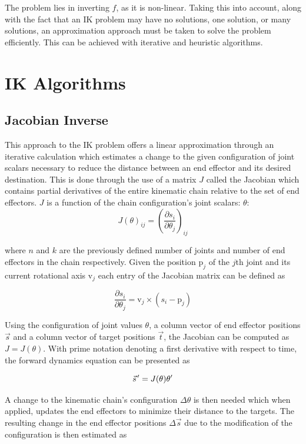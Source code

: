 The problem lies in inverting \(f\), as it is non-linear. Taking this into
account, along with the fact that an IK problem may have no solutions, one
solution, or many solutions, an approximation approach must be taken to solve
the problem efficiently. This can be achieved with iterative and heuristic
algorithms.

\section{IK Algorithms}
\subsection{Jacobian Inverse}
This approach to the IK problem offers a linear approximation through an
iterative calculation which estimates a change to the given configuration of
joint scalars necessary to reduce the distance between an end effector and its
desired destination. This is done through the use of a matrix \(J\) called the
Jacobian which contains partial derivatives of the entire kinematic chain
relative to the set of end effectors. \(J\) is a function of the chain
configuration's joint scalars:
\(\theta\):
\begin{equation}
    J(\theta)_{ij} = \left(\frac{\partial s_i}{\partial \theta_j}\right)_{ij}
\end{equation}

where \(n\) and \(k\) are the previously defined number of joints and number of
end effectors in the chain respectively. Given the position \(\mbox{p}_j\) of
the \(j\)th joint and its current rotational axis \(\mbox{v}_j\) each entry of
the Jacobian matrix can be defined as

\begin{equation}
    \frac{\partial s_i}{\partial \theta_j} = \mbox{v}_j \times (s_i - \mbox{p}_j)
\end{equation}

Using the configuration of joint values \(\theta\), a column vector of end
effector positions \(\vec{s}\) and a column vector of target positions
\(\vec{t}\), the Jacobian can be computed as \(J = J(\theta)\). With prime
notation denoting a first derivative with respect to time, the forward dynamics
equation can be presented as

\begin{equation}
    \pvec{s}^\prime = J(\theta)\theta^\prime
\end{equation}

A change to the kinematic chain's configuration \(\Delta \theta\) is then needed
which when applied, updates the end effectors to minimize their distance to the
targets. The resulting change in the end effector positions \(\Delta \vec{s}\)
due to the modification of the configuration is then estimated as

